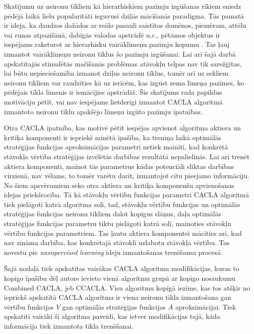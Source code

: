 \documentclass{ludis} %
\begin{document}
Skatījumu uz neironu tīkliem kā hierarhiskiem pazīmju izgūšanas rīkiem sniedz
pēdējā laikā lielu popularitāti ieguvusī dziļās mācīšanās paradigma. Tās pamatā
ir ideja, ka daudzos dažādos ar reālo pasauli saistītos domēnos, piemēram, attēlu
vai runas atpazīšānā, dabīgās valodas apstrādē u.c., pētāmos objektus ir
iespējams raksturot ar hierarhisku vairāklīmeņu pazīmju kopumu \autocite{Lecun2015}. Tas ļauj
izmantot vairākļīmeņu neironu tīklus šo pazīmju izgūšanai. %
Lai arī šajā darbā apskatītajās stimulētās mačīšanās problēmas atāvokļu telpas
nav tik sarežģītas, lai būtu nepieciešamība izmanot dziļus neironu tīklus, tomēr
arī uz sekliem neironu tīkliem var raudzīties kā uz ierīcēm, kas izgūst zema
līmeņa pazīmes, ko pēdējais tīkla līmenis ir iemācījies apstrādāt. Šis skatījums
rada papildus motivāciju pētīt, vai nav iespējams lietderīgi izmantot CACLA
algoritmā izmantoto neironu tīklu apakšējo līmeņu izgūto pazīmju īpatnības.

Otra CACLA īpatnība, kas motivē pētīt iespējas apvienot algoritma aktiera un
kritiķa komponenti ir iepriekš minētā īpašība, ka treniņa laikā optimālās
stratēģijas funkcijas aproksimācijas parametri netiek mainīti, kad konkrētā
stāvokļa vērtība stratēģijas izvēlētās darbības rezultātā nepalielinās. Lai arī
trenēt aktiera komponenti, mainot tās parametrus kādas potenciāli sliktas
darbības virzienā, nav vēlams, to tomēr varētu darīt, izmantojot citu
pieejamo informāciju. No šiem apsvērumiem seko otra aktiera un kritiķa
komponenšu apvienošanas idejas priekšrocība. Tā kā stāvokļu vērtību funkcijas
parametri CACLA algoritmā tiek pielāgoti katrā algoritma solī, tad, stāvokļu
vērtību funkcijas un optimālās stratēģijas funkcijas neironu tīkliem dalot
kopīgus slāņus, daļa optimālās stratēģijas funkcijas parametru tiktu pielāgoti
katrā solī, mainoties stāvokļu vērtību funkcijas parametriem. Tas ļautu aktiera
komponentei mācīties arī, kad nav zināma darbība, kas konkrētajā stāvoklī
uzlabotu stāvokļa vērtību. Tas novestu pie \textit{unsupervised learning} ideju
izmantošanas trenēšansa procesā. %

Šajā nodaļā tiek apskatītas vairākas CACLA algoritma modifikācijas, kuras to
kopīgo īpašību dēļ autors ievieto vienā algoritmu grupā ar kopīgo nosaukumu
Combined CACLA, jeb CCACLA. Visu algoritmu kopīgā iezīme, kas tos atšķir no
iepriekš apskatītā CACLA algoritma ir viena neironu tīkla izmantošana gan
vērtību funkcijas $V$ gan optimālās stratēģijas funkcijas $A$ aproksimācijai.
Tiek apskatīti vairāki šī algoritma paveidi, kas ietver modifikācijas tajā, kāda
informācija tiek izmantota tīkla trenēšanai.
\end{document}
